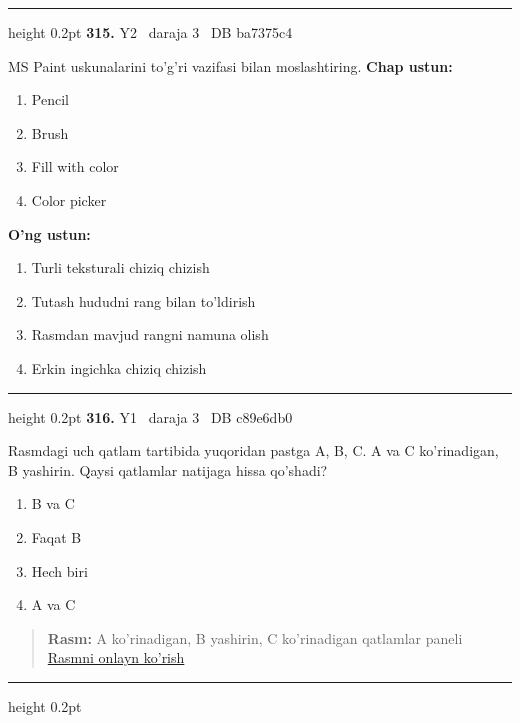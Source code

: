\documentclass[10pt,a4paper,oneside]{article}
\begin{document}
\vspace{2mm}\hrule height 0.2pt \vspace{4mm}
\hypertarget{q315}{\textbf{\color{ink}315.}}  {\color{muted}\scriptsize Y2 \textbullet\ daraja 3 \textbullet\ DB ba7375c4}
\par
MS Paint uskunalarini to'g'ri vazifasi bilan moslashtiring.
\textbf{\footnotesize Chap ustun:}
\begin{enumerate}[label=\arabic*),leftmargin=9mm]
\item Pencil
\item Brush
\item Fill with color
\item Color picker
\end{enumerate}
\textbf{\footnotesize O'ng ustun:}
\begin{enumerate}[label=\Alph*),leftmargin=9mm]
\item Turli teksturali chiziq chizish
\item Tutash hududni rang bilan to'ldirish
\item Rasmdan mavjud rangni namuna olish
\item Erkin ingichka chiziq chizish
\end{enumerate}
\vspace{2mm}\hrule height 0.2pt \vspace{4mm}
\hypertarget{q316}{\textbf{\color{ink}316.}}  {\color{muted}\scriptsize Y1 \textbullet\ daraja 3 \textbullet\ DB c89e6db0}
\par
Rasmdagi uch qatlam tartibida yuqoridan pastga A, B, C. A va C ko'rinadigan, B yashirin. Qaysi qatlamlar natijaga hissa qo'shadi?
\begin{enumerate}[label=\Alph*),leftmargin=9mm]
\item B va C
\item Faqat B
\item Hech biri
\item A va C
\end{enumerate}
\begin{quote}\footnotesize\color{muted}\textbf{Rasm:} A ko'rinadigan, B yashirin, C ko'rinadigan qatlamlar paneli\\
\href{https://github.com/sarvar9417/attestatsiya/blob/main/public/graphics-web-v2/layer_stack.svg}{Rasmni onlayn ko'rish}
\end{quote}
\vspace{2mm}\hrule height 0.2pt \vspace{4mm}
\end{document}
